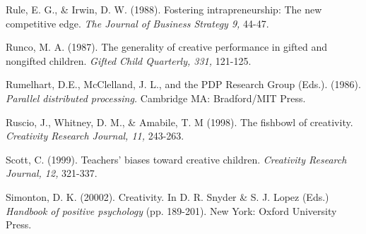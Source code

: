 \documentclass[a4paper,12pt,man,british]{apa6}
\begin{document}
\begin{description}
\item Rule, E. G., \& Irwin, D. W. (1988). Fostering intrapreneurship: The new competitive edge. \emph{The
Journal of Business Strategy 9,} 44-47.

\item Runco, M. A. (1987). The generality of creative performance in gifted and nongifted children. \emph{ Gifted Child Quarterly, 331,} 121-125.



\item Rumelhart, D.E., McClelland, J. L., and the PDP Research Group (Eds.). (1986). \emph{Parallel distributed processing.} Cambridge MA: Bradford/MIT Press.

\item Ruscio, J., Whitney, D. M., \& Amabile, T. M (1998). The fishbowl of creativity. \emph{Creativity Research Journal, 11,} 243-263. 



\item Scott, C. (1999). Teachers' biases toward creative children. \emph{Creativity Research Journal, 12,} 321-337.


\item Simonton, D. K. (20002). Creativity. In D. R. Snyder \& S. J. Lopez (Eds.) \emph{Handbook of positive psychology} (pp. 189-201). New York: Oxford University Press.



\end{description}
\end{document}
